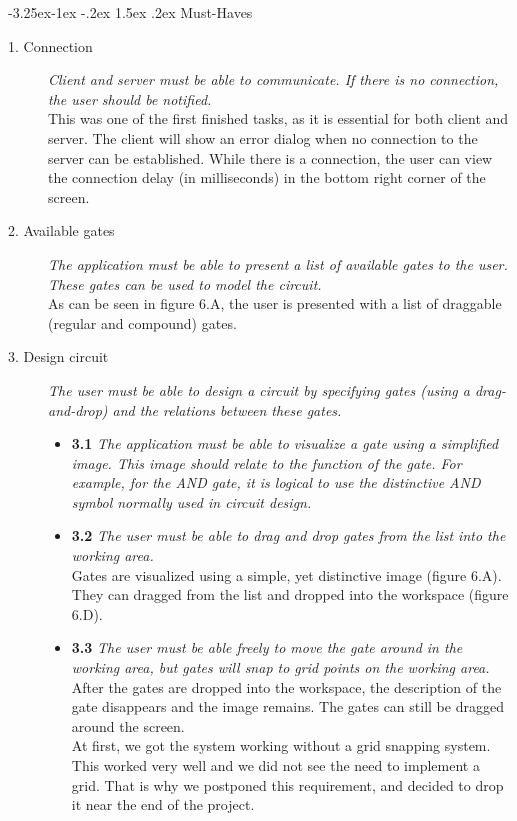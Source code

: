 \documentclass[a4paper]{article}
\makeatletter
\renewcommand\paragraph{\@startsection{paragraph}{4}{\z@}%
  {-3.25ex\@plus -1ex \@minus -.2ex}%
  {1.5ex \@plus .2ex}%
  {\normalfont\normalsize\bfseries}}
\makeatother
\begin{document}
\paragraph{Must-Haves}
\begin{description}
\item[1. Connection] \textit{Client and server must be able to communicate. If there is no connection, the user should be notified.}\\
This was one of the first finished tasks, as it is essential for both client and server. The client will show an error dialog when no connection to the server can be established. While there is a connection, the user can view the connection delay (in milliseconds) in the bottom right corner of the screen.

\item[2. Available gates] \textit{The application must be able to present a list of available gates to the user. These gates can be used to model the circuit.}\\
As can be seen in figure 6.A, the user is presented with a list of draggable (regular and compound) gates.

\item[3. Design circuit] \textit{The user must be able to design a circuit by specifying gates (using a drag-and-drop) and the relations between these gates.}
	\begin{itemize}
	\item \textbf{3.1} \textit{The application must be able to visualize a gate using a simplified image. This image should relate to the function of the gate. For example, for the AND gate, it is logical to use the distinctive AND symbol normally used in circuit design.}
	\item \textbf{3.2} \textit{The user must be able to drag and drop gates from the list into the working area.}\\
	Gates are visualized using a simple, yet distinctive image (figure 6.A). They can dragged from the list and dropped into the workspace (figure 6.D).

	\item \textbf{3.3} \textit{The user must be able freely to move the gate around in the working area, but gates will snap to grid points on the working area.}\\
	After the gates are dropped into the workspace, the description of the gate disappears and the image remains. The gates can still be dragged around the screen.\\
	At first, we got the system working without a grid snapping system. This worked very well and we did not see the need to implement a grid. That is why we postponed this requirement, and decided to drop it near the end of the project.


\end{itemize}
\end{description}
\end{document}
